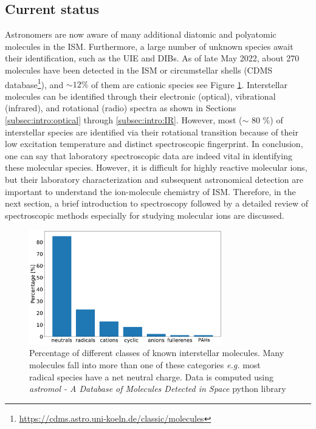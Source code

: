 \subsection{Current status}
Astronomers are now aware of many additional diatomic and polyatomic molecules in the ISM. Furthermore, a large number of unknown species await their identification, such as the UIE and DIBs. As of late May 2022, about 270 molecules have been detected in the ISM or circumstellar shells (CDMS database\footnote{\url{https://cdms.astro.uni-koeln.de/classic/molecules}}), and $\sim 12 \%$ of them are cationic species \cite{mcguire_2021_2021} see Figure \ref{fig:ISM_molecules}. Interstellar molecules can be identified through their electronic (optical), vibrational (infrared), and rotational (radio) spectra as shown in Sections \ref{subsec:intro:optical} through \ref{subsec:intro:IR}. However, most ($\sim$ 80 \%) of interstellar species are identified via their rotational transition \cite{mcguire_2021_2021} because of their low excitation temperature and distinct spectroscopic  fingerprint. In conclusion, one can say that laboratory spectroscopic data are indeed vital in identifying these molecular species. However, it is difficult for highly reactive molecular ions, but their laboratory characterization and subsequent astronomical detection are important to understand the ion-molecule chemistry of ISM. Therefore, in the next section, a brief introduction to spectroscopy followed by a detailed review of spectroscopic methods especially for studying molecular ions are discussed.

\begin{figure}[!htb]
    \centering
    \includegraphics[width=0.75\textwidth]{figures/intro/known_molecules_in_space.pdf}
    \caption{Percentage of different classes of  known interstellar molecules. Many molecules fall into more than one of these categories \emph{e.g.} most radical species have a net neutral charge. Data is computed using \emph{astromol - A Database of Molecules Detected in Space} python library \cite{mcguire_astromol_2021}}
    \label{fig:ISM_molecules}
\end{figure}
